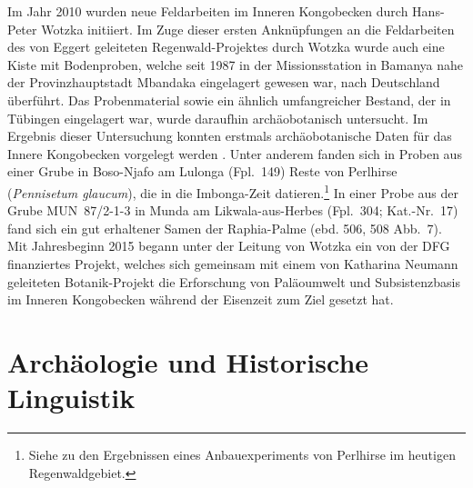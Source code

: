 \begin{multicols}{2}
Im Jahr 2010 wurden neue Feldarbeiten im Inneren Kongobecken durch Hans-Peter Wotzka initiiert. Im Zuge dieser ersten Anknüpfungen an die Feldarbeiten des von Eggert geleiteten Regenwald-Projektes durch Wotzka wurde auch eine Kiste mit Bodenproben, welche seit 1987 in der Missionsstation in Bamanya nahe der Provinzhauptstadt Mbandaka eingelagert gewesen war, nach Deutschland überführt. Das Probenmaterial sowie ein ähnlich umfangreicher Bestand, der in Tübingen eingelagert war, wurde daraufhin archäobotanisch untersucht. Im Ergebnis dieser Untersuchung konnten erstmals archäobotanische Daten für das Innere Kongobecken vorgelegt werden \parencite{Kahlheber.2014}. Unter anderem fanden sich in Proben aus einer Grube in Boso-Njafo am Lulonga (Fpl.~149) Reste von Perlhirse (\textit{Pennisetum glaucum}), die in die Imbonga-Zeit datieren.\footnote{Siehe \textcites{Wotzka.2019}{Wotzka.2019a} zu den Ergebnissen eines Anbauexperiments von Perlhirse im heutigen Regenwaldgebiet.} In einer Probe aus der Grube MUN~87/2-1-3 in Munda am Likwala-aus-Herbes (Fpl.~304; Kat.-Nr.~17) fand sich ein gut erhaltener Samen der Raphia-Palme (ebd. 506, 508 Abb.~7). Mit Jahresbeginn 2015 begann unter der Leitung von Wotzka ein von der DFG finanziertes Projekt, welches sich gemeinsam mit einem von Katharina Neumann geleiteten Botanik-Projekt die Erforschung von Paläoumwelt und Subsistenzbasis im Inneren Kongobecken während der Eisenzeit zum Ziel gesetzt hat.


\section{Archäologie und Historische Linguistik}


\end{multicols}

